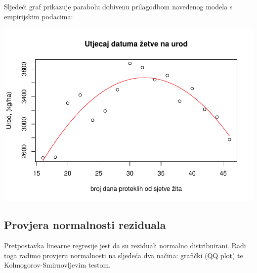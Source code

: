 \documentclass[]{article}
\newenvironment{Shaded}{\begin{snugshade}}{\end{snugshade}}
\newcommand{\KeywordTok}[1]{\textcolor[rgb]{0.13,0.29,0.53}{\textbf{{#1}}}}
\newcommand{\DataTypeTok}[1]{\textcolor[rgb]{0.13,0.29,0.53}{{#1}}}
\newcommand{\DecValTok}[1]{\textcolor[rgb]{0.00,0.00,0.81}{{#1}}}
\newcommand{\StringTok}[1]{\textcolor[rgb]{0.31,0.60,0.02}{{#1}}}
\newcommand{\OtherTok}[1]{\textcolor[rgb]{0.56,0.35,0.01}{{#1}}}
\newcommand{\NormalTok}[1]{{#1}}
\begin{document}
Sljedeći graf prikazuje parabolu dobivenu prilagodbom navedenog modela s
empirijskim podacima:

\begin{Shaded}
\end{Shaded}

\includegraphics{Izvjestaj_files/figure-latex/unnamed-chunk-18-1.pdf}

\subsection{Provjera normalnosti
reziduala}\label{provjera-normalnosti-reziduala-1}

Pretpostavka linearne regresije jest da su reziduali normalno
distribuirani. Radi toga radimo provjeru normalnosti na sljedeća dva
načina: grafički (QQ plot) te Kolmogorov-Smirnovljevim testom.
\end{document}

